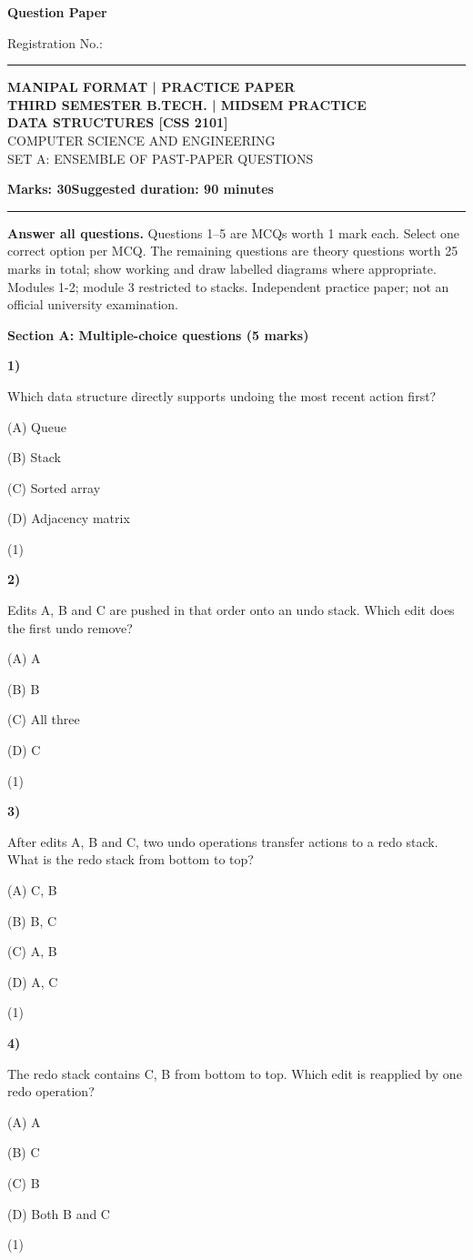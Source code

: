 \documentclass[10pt,a4paper]{article}
\newcommand{\question}[3]{\par\vspace{6pt}\noindent\begin{minipage}[t]{0.075\linewidth}\textbf{#1)}\end{minipage}\begin{minipage}[t]{0.855\linewidth}#3\end{minipage}\hfill\begin{minipage}[t]{0.055\linewidth}\raggedleft(#2)\end{minipage}\par}
\begin{document}
{\LARGE\bfseries Question Paper}\hfill {\small Registration No.: \rule{33mm}{0.3pt}}\par\vspace{8pt}
\begin{center}{\large\bfseries MANIPAL FORMAT | PRACTICE PAPER}\\[6pt]{\bfseries THIRD SEMESTER B.TECH. | MIDSEM PRACTICE}\\[4pt]{\bfseries DATA STRUCTURES [CSS 2101]}\\[4pt]{\small COMPUTER SCIENCE AND ENGINEERING}\\[3pt]{\small SET A: ENSEMBLE OF PAST-PAPER QUESTIONS}\end{center}
\textbf{Marks: 30}\hfill\textbf{Suggested duration: 90 minutes}\par\vspace{3pt}\hrule\vspace{5pt}
{\small\textbf{Answer all questions.} Questions 1--5 are MCQs worth 1 mark each. Select one correct option per MCQ. The remaining questions are theory questions worth 25 marks in total; show working and draw labelled diagrams where appropriate. Modules 1-2; module 3 restricted to stacks. Independent practice paper; not an official university examination.}\par
\medskip\textbf{Section A: Multiple-choice questions (5 marks)}\par
\question{1}{1}{Which data structure directly supports undoing the most recent action first?\par (A) Queue\par (B) Stack\par (C) Sorted array\par (D) Adjacency matrix}
\question{2}{1}{Edits A, B and C are pushed in that order onto an undo stack. Which edit does the first undo remove?\par (A) A\par (B) B\par (C) All three\par (D) C}
\question{3}{1}{After edits A, B and C, two undo operations transfer actions to a redo stack. What is the redo stack from bottom to top?\par (A) C, B\par (B) B, C\par (C) A, B\par (D) A, C}
\question{4}{1}{The redo stack contains C, B from bottom to top. Which edit is reapplied by one redo operation?\par (A) A\par (B) C\par (C) B\par (D) Both B and C}
\end{document}
